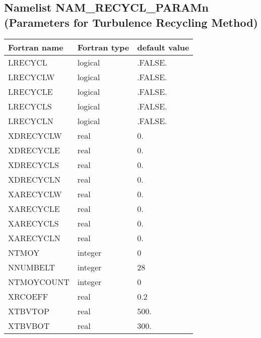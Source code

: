 \subsection{Namelist NAM\_RECYCL\_PARAMn (Parameters for Turbulence Recycling Method)}
\begin{longtable} {|p{}|p{}|p{}|}
\hline
Fortran name &  Fortran type & default value \\
\hline 
\endhead
\hline
\endfoot
LRECYCL              & logical       & .FALSE.       \\
LRECYCLW             & logical       & .FALSE.       \\
LRECYCLE             & logical       & .FALSE.       \\
LRECYCLS             & logical       & .FALSE.       \\
LRECYCLN             & logical       & .FALSE.       \\
XDRECYCLW            & real          & 0.            \\
XDRECYCLE            & real          & 0.            \\
XDRECYCLS            & real          & 0.            \\
XDRECYCLN            & real          & 0.            \\
XARECYCLW            & real          & 0.            \\
XARECYCLE            & real          & 0.            \\
XARECYCLS            & real          & 0.            \\
XARECYCLN            & real          & 0.            \\
NTMOY                & integer       & 0             \\
NNUMBELT             & integer       & 28            \\
NTMOYCOUNT           & integer       & 0             \\
XRCOEFF              & real          & 0.2           \\
XTBVTOP              & real          & 500.          \\
XTBVBOT              & real          & 300.          \\
\end{longtable}

